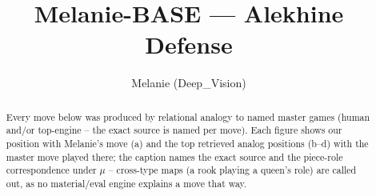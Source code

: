 \documentclass[11pt]{article}
\title{Melanie-BASE — Alekhine Defense}
\author{Melanie (Deep\_Vision)}
\date{}
\begin{document}
\maketitle

\begin{abstract}Every move below was produced by relational analogy to named master games (human and/or top-engine -- the exact source is named per move). Each figure shows our position with Melanie's move (a) and the top retrieved analog positions (b--d) with the master move played there; the caption names the exact source and the piece-role correspondence under $\mu$ -- cross-type maps (a rook playing a queen's role) are called out, as no material/eval engine explains a move that way.\end{abstract}

\begin{figure}[p]\centering
\begin{subfigure}{0.46\textwidth}\centering
\resizebox{\linewidth}{!}{%
\newchessgame
\chessboard[
  setfen={rnbqk2r/ppp1ppbp/1n1p2p1/4P3/3P4/1B3N2/PPP2PPP/RNBQK2R w KQkq - 4 7},
  showmover=false,
  pgfstyle=straightmove, color=movearrow, markmove={h1-g1}
]}
\caption{}
\end{subfigure}\hfill
\begin{subfigure}{0.46\textwidth}\centering
\resizebox{\linewidth}{!}{%
\newchessgame
\chessboard[
  setfen={rnbqkb1r/pp3ppp/2p2n2/3pp3/4P3/1B1P1N2/PPP2PPP/RNBQK2R b KQkq - 1 5},
  showmover=false,
  pgfstyle=straightmove, color=movearrow, markmove={f8-d6}
]}
\caption{}
\end{subfigure}
\\[4pt]
\begin{subfigure}{0.46\textwidth}\centering
\resizebox{\linewidth}{!}{%
\newchessgame
\chessboard[
  setfen={rnbqkb1r/pp3ppp/2p2n2/3pp3/4P3/1B1P1N2/PPP2PPP/RNBQK2R b KQkq - 1 5},
  showmover=false,
  pgfstyle=straightmove, color=movearrow, markmove={f8-d6}
]}
\caption{}
\end{subfigure}\hfill
\begin{subfigure}{0.46\textwidth}\centering
\resizebox{\linewidth}{!}{%
\newchessgame
\chessboard[
  setfen={rnbqkb1r/pp3ppp/2p2n2/3pp3/4P3/1B1P1N2/PPP2PPP/RNBQK2R b KQkq - 1 5},
  showmover=false,
  pgfstyle=straightmove, color=movearrow, markmove={f8-d6}
]}
\caption{}
\end{subfigure}

\end{figure}
\end{document}
